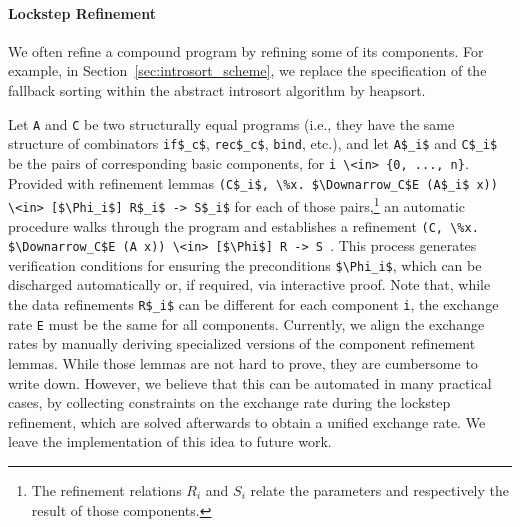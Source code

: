 \documentclass[acmsmall]{acmart}
\newcommand{\is}{\lstinline[language=isabelle]}
\begin{document}




\paragraph{Lockstep Refinement}
We often refine a compound program by refining some of its components.
For example, in Section~\ref{sec:introsort_scheme}, we replace the specification of the fallback sorting within the abstract introsort algorithm by heapsort.

Let \is{A} and \is{C} be two structurally equal programs (i.e., they have the same structure of combinators \is{if$_c$}, \is{rec$_c$}, \is{bind}, etc.), and let \is{A$_i$} and \is{C$_i$} be the pairs of corresponding basic components, for \is$i \<in> {0, ..., n}$.
Provided with refinement lemmas \is{(C$_i$, \%x. $\Downarrow_C$E (A$_i$ x)) \<in> [$\Phi_i$] R$_i$ -> S$_i$} for each of those pairs,\footnote{The refinement relations $R_i$ and $S_i$ relate the parameters and respectively the result of those components.} an automatic procedure walks through the program and establishes a refinement \is{(C, \%x. $\Downarrow_C$E (A x)) \<in> [$\Phi$] R -> S }.
This process generates verification conditions for ensuring the preconditions \is{$\Phi_i$}, which can be discharged automatically or, if required, via interactive proof.
\clearpage
Note that, while the data refinements \is{R$_i$} can be different for each component \is$i$, the exchange rate \is$E$ must be the same for all components.
%
Currently, we align the exchange rates by manually deriving 
specialized versions of the component refinement lemmas.
%
While those lemmas are not hard to prove, they are cumbersome to write down.
%
However, we believe that this can be automated in many practical cases, by collecting constraints on the exchange rate during the lockstep refinement, which are solved afterwards to obtain a unified exchange rate. We leave the implementation of this idea to future work.
\end{document}
